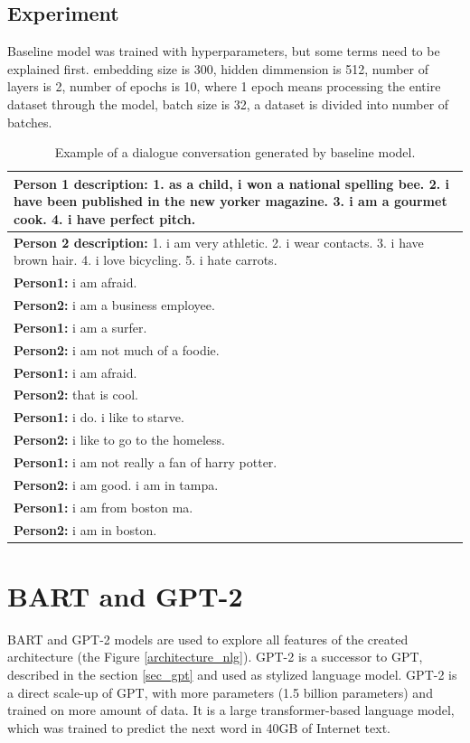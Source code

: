 \subsection{Experiment}

Baseline model was trained with hyperparameters, but some terms need to be explained first. embedding size is 300, hidden dimmension is 512, number of layers is 2, number of epochs is 10, where 1 epoch means processing the entire dataset through the model, batch size is 32, a dataset is divided into number of batches.

\begin{table}[ht]
\centering
 \begin{tabular}{|p{14cm}|}
 \hline\hline
 \textbf{Person 1 description:} 1. as a child, i won a national spelling bee. 2. i have been published in the new yorker magazine. 3. i am a gourmet cook. 4. i have perfect pitch. \\
 \hline
 \textbf{Person 2 description:} 1. i am very athletic. 2. i wear contacts. 3. i have brown hair. 4. i love bicycling. 5. i hate carrots. \\
 \hline\hline
 \textbf{Person1:} i am afraid. \\
 \textbf{Person2:} i am a business employee.  \\ 
 \textbf{Person1:} i am a surfer. \\
 \textbf{Person2:} i am not much of a foodie. \\
 \textbf{Person1:} i am afraid. \\
 \textbf{Person2:} that is cool. \\
 \textbf{Person1:} i do. i like to starve. \\
 \textbf{Person2:} i like to go to the homeless. \\
 \textbf{Person1:} i am not really a fan of harry potter. \\
 \textbf{Person2:} i am good. i am in tampa. \\
 \textbf{Person1:} i am from boston ma. \\
 \textbf{Person2:} i am in boston. \\
 \hline\hline
 \end{tabular}
 \caption{Example of a dialogue conversation generated by baseline model.}
\label{tab:baseline_experiment}
\end{table}

\section{BART and GPT-2}
BART and GPT-2 models are used to explore all features of the created architecture (the Figure \ref{architecture_nlg}). GPT-2 is a successor to GPT, described in the section \ref{sec_gpt} and used as stylized language model. GPT-2 is a direct scale-up of GPT, with more parameters (1.5 billion parameters) and trained on more amount of data. It is a large transformer-based language model, which was trained to predict the next word in 40GB of Internet text. 

